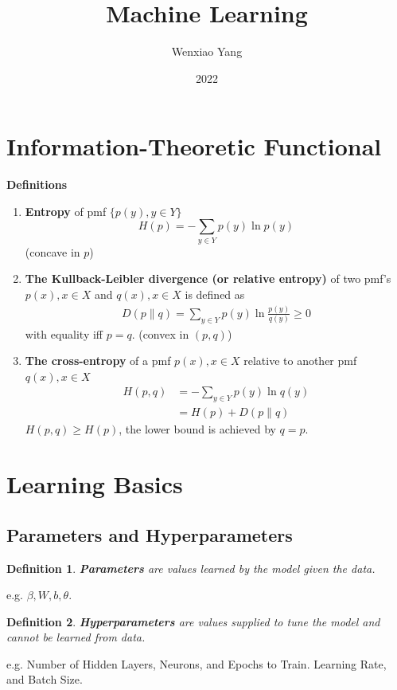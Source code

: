 \documentclass[11pt,a4paper]{article}
\title{\textbf{Machine Learning}}
\author[*]{Wenxiao Yang}
\affil[*]{Department of Mathematics, University of Illinois at Urbana-Champaign}
\date{2022}
\newtheorem{definition}{Definition}
\begin{document}
\maketitle
\tableofcontents
\newpage




\section{Information-Theoretic Functional}
\textbf{Definitions}
\begin{enumerate}
    \item \textbf{Entropy} of pmf $\{p(y),y\in Y\}$ $$H(p)=-\sum_{y\in Y}p(y)\ln p(y)$$
    (concave in $p$)
    \item \textbf{The Kullback-Leibler divergence (or relative entropy)} of two pmf's $p(x), x\in X$ and $q(x), x\in X$ is defined as
    \begin{equation}
        \begin{aligned}
            D(p\| q)=\sum_{y\in Y}p(y)\ln\frac{p(y)}{q(y)}\geq 0
        \end{aligned}
        \nonumber
    \end{equation}
    with equality iff $p=q$. (convex in $(p,q)$)
    \item \textbf{The cross-entropy} of a pmf $p(x),x\in X$ relative to another pmf $q(x), x\in X$
    \begin{equation}
        \begin{aligned}
            H(p, q)&=-\sum_{y\in Y}p(y)\ln q(y)\\&=H(p)+D(p\| q)
        \end{aligned}
        \nonumber
    \end{equation}
    $H(p,q)\geq H(p)$, the lower bound is achieved by $q=p$.
\end{enumerate}



\section{Learning Basics}
\subsection{Parameters and Hyperparameters}
\begin{definition}
    \textbf{Parameters} are values learned by the model given the data.
\end{definition}
e.g. $\beta, W, b, \theta$.
\begin{definition}
    \textbf{Hyperparameters} are values supplied to tune the model and cannot be learned from data.
\end{definition}
e.g. Number of Hidden Layers, Neurons, and Epochs to Train. Learning Rate, and Batch Size.
\end{document}
